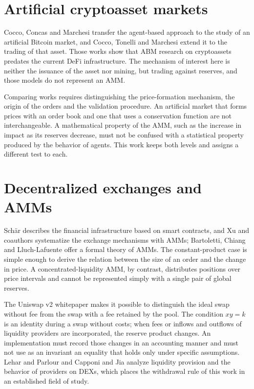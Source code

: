 \section{Artificial cryptoasset markets}

Cocco, Concas and Marchesi \cite{cocco2017artificial} transfer the agent-based approach to the study of an artificial Bitcoin market, and Cocco, Tonelli and Marchesi \cite{cocco2019agent} extend it to the trading of that asset. Those works show that ABM research on cryptoassets predates the current DeFi infrastructure. The mechanism of interest here is neither the issuance of the asset nor mining, but trading against reserves, and those models do not represent an AMM.

Comparing works requires distinguishing the price-formation mechanism, the origin of the orders and the validation procedure. An artificial market that forms prices with an order book and one that uses a conservation function are not interchangeable. A mathematical property of the AMM, such as the increase in impact as its reserves decrease, must not be confused with a statistical property produced by the behavior of agents. This work keeps both levels and assigns a different test to each.

\section{Decentralized exchanges and AMMs}

Schär \cite{schar2021defi} describes the financial infrastructure based on smart contracts, and Xu and coauthors \cite{xu2023sok} systematize the exchange mechanisms with AMMs; Bartoletti, Chiang and Lluch-Lafuente \cite{bartoletti2022theory} offer a formal theory of AMMs. The constant-product case is simple enough to derive the relation between the size of an order and the change in price. A concentrated-liquidity AMM, by contrast, distributes positions over price intervals and cannot be represented simply with a single pair of global reserves.

The Uniswap v2 whitepaper \cite{adams2020uniswap} makes it possible to distinguish the ideal swap without fee from the swap with a fee retained by the pool. The condition $xy=k$ is an identity during a swap without costs; when fees or inflows and outflows of liquidity providers are incorporated, the reserve product changes. An implementation must record those changes in an accounting manner and must not use as an invariant an equality that holds only under specific assumptions. Lehar and Parlour \cite{lehar2025uniswap} and Capponi and Jia \cite{capponi2025liquidity} analyze liquidity provision and the behavior of providers on DEXs, which places the withdrawal rule of this work in an established field of study.

